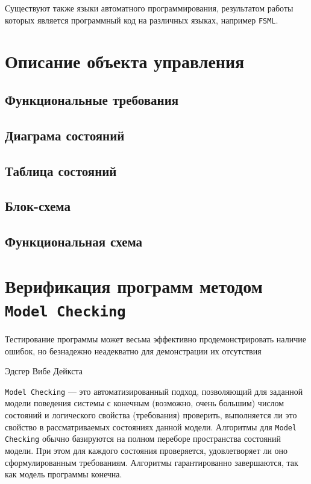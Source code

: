 \documentclass[12pt, twoside]{report}
\begin{document}
Существуют также языки автоматного программирования, результатом работы которых является программный 
код на различных языках, например \texttt{FSML}\cite{Lagunov:FSML}.

\chapter*{Описание объекта управления}

\section*{Функциональные требования}

\section*{Диаграма состояний}

\section*{Таблица состояний}

\section*{Блок-схема}

\section*{Функциональная схема}

\chapter*{Верификация программ методом \texttt{Model Checking}}

\epigraph{Тестирование программы может весьма эффективно продемонстрировать наличие ошибок, но безнадежно неадекватно для демонстрации их отсутствия}{Эдсгер Вибе Дейкста}


\texttt{Model Checking\cite{Shalito:ModelChecking}} — это автоматизированный подход, позволяющий для заданной модели поведения 
системы с конечным (возможно, очень большим) числом состояний и логического свойства 
(требования) проверить, выполняется ли это свойство в рассматриваемых состояниях данной модели.
Алгоритмы для \texttt{Model Checking} обычно базируются на полном переборе пространства состояний модели. 
При этом для каждого состояния проверяется, удовлетворяет ли оно сформулированным требованиям. 
Алгоритмы гарантированно завершаются, так как модель программы конечна.
\end{document}
